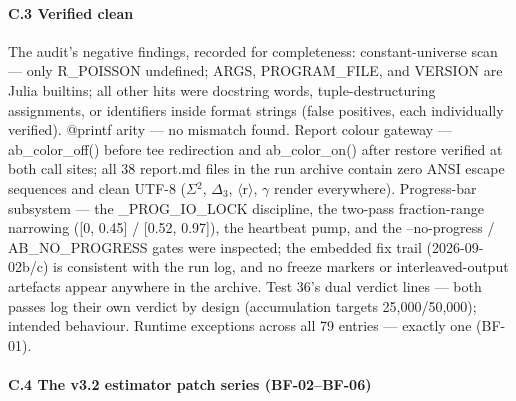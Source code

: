 \documentclass[10pt]{article}
\begin{document}
\paragraph{C.3 Verified clean}

The audit's negative findings, recorded for completeness: constant-universe scan --- only R\_POISSON undefined; ARGS, PROGRAM\_FILE, and VERSION are Julia builtins; all other hits were docstring words, tuple-destructuring assignments, or identifiers inside format strings (false positives, each individually verified). @printf arity --- no mismatch found. Report colour gateway --- ab\_color\_off() before tee redirection and ab\_color\_on() after restore verified at both call sites; all 38 report.md files in the run archive contain zero ANSI escape sequences and clean UTF-8 ($\Sigma$$^2$, $\Delta$$_3$, $\langle$r$\rangle$, $\gamma$ render everywhere). Progress-bar subsystem --- the \_PROG\_IO\_LOCK discipline, the two-pass fraction-range narrowing ([0, 0.45] / [0.52, 0.97]), the heartbeat pump, and the --no-progress / AB\_NO\_PROGRESS gates were inspected; the embedded fix trail (2026-09-02b/c) is consistent with the run log, and no freeze markers or interleaved-output artefacts appear anywhere in the archive. Test 36's dual verdict lines --- both passes log their own verdict by design (accumulation targets 25,000/50,000); intended behaviour. Runtime exceptions across all 79 entries --- exactly one (BF-01).

\paragraph{C.4 The v3.2 estimator patch series (BF-02--BF-06)}
\end{document}

